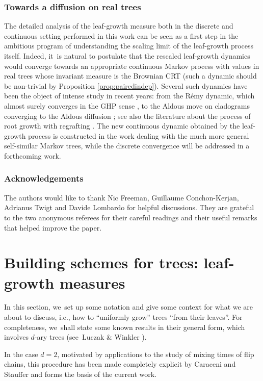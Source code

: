 \documentclass[JEP,XML,SOM,Unicode,NoFloatCountersInSection, NoEqCountersInSection,published]{cedram}
\theoremstyle{definition}
\begin{document}
\subsubsection*{Towards a diffusion on real trees} The detailed analysis of the leaf-growth measure both in the discrete and continuous setting performed in this work can be seen as a first step in the ambitious program of understanding the scaling limit of the leaf-growth process itself. Indeed, it~is natural to postulate that the rescaled leaf-growth dynamics would converge towards an appropriate continuous Markov process with values in real trees whose invariant measure is the Brownian CRT (such a dynamic should be non-trivial by Proposition \ref{prop:pairedindep}). Several such dynamics have been the \hbox{object} of intense study in recent years: from the Rémy dynamic, which almost surely converges in the GHP sense \cite{CurienHaas}, to the Aldous move on cladograms converging to the Aldous diffusion \cite{lohr2020aldous,FPRW18,FPRW20,forman2023aldous}; see also the literature about the process of root growth with regrafting \cite{MR2221786}. The new continuous dynamic obtained by the leaf-growth process is constructed in the work \cite{CFT25} dealing with the much more general self-similar Markov trees, while the discrete convergence will be addressed in a forthcoming work.

\subsubsection*{Acknowledgements}
The authors would like to thank Nic Freeman, Guillaume Conchon-Kerjan, Adrianus Twigt and Davide Lombardo for helpful discussions. They are grateful to the two anonymous referees for their careful readings and their useful remarks that helped improve the paper.

\section{Building schemes for trees: leaf-growth measures}\label{section:building schemes}

In this section, we~set up some notation and give some context for what we are about to discuss, i.e., how to ``uniformly grow'' trees ``from their leaves''. For completeness, we~shall state some known results in their general form, which involves $d$-ary trees (see~Luczak \& Winkler \cite{LW04}).

In the case $d=2$, motivated by applications to the study of mixing times of flip chains, this procedure has been made completely explicit by Caraceni and Stauffer \cite{CS20} and forms the basis of the current work.
\end{document}
